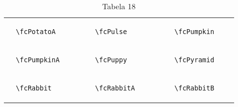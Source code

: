 \documentclass[x11names]{article}
\begin{document}
\begin{table}[H]
\begin{tabular}{|c|c|c|c|c|c|}
		&\multirow{5}{*}{	\fcPotatoA	[scale=0.4]} & &\multirow{5}{*}{	\fcPulse	[scale=0.4]} & &\multirow{5}{*}{	\fcPumpkin	[scale=0.8]}\\	& & & & & \\	& & & & & \\	\verb|	\fcPotatoA	| & & \verb|	\fcPulse	| & & \verb|	\fcPumpkin	| & \\	& & & & & \\	& & & & & \\	& & & & & \\	\hline									
		&\multirow{5}{*}{	\fcPumpkinA	[scale=0.8]} & &\multirow{5}{*}{	\fcPuppy	[scale=0.4]} & &\multirow{5}{*}{	\fcPyramid	[scale=0.4]}\\	& & & & & \\	& & & & & \\	\verb|	\fcPumpkinA	| & & \verb|	\fcPuppy	| & & \verb|	\fcPyramid	| & \\	& & & & & \\	& & & & & \\	& & & & & \\	\hline									
		&\multirow{5}{*}{	\fcRabbit	[scale=0.8]} & &\multirow{5}{*}{	\fcRabbitA	[scale=0.8]} & &\multirow{5}{*}{	\fcRabbitB	[scale=0.4]}\\	& & & & & \\	& & & & & \\	\verb|	\fcRabbit	| & & \verb|	\fcRabbitA	| & & \verb|	\fcRabbitB	| & \\	& & & & & \\	& & & & & \\	& & & & & \\		\hline 	\hline 	\end{tabular}	\caption{	Tabela 18	}\label{	Tab18	}\end{table}
\end{document}
